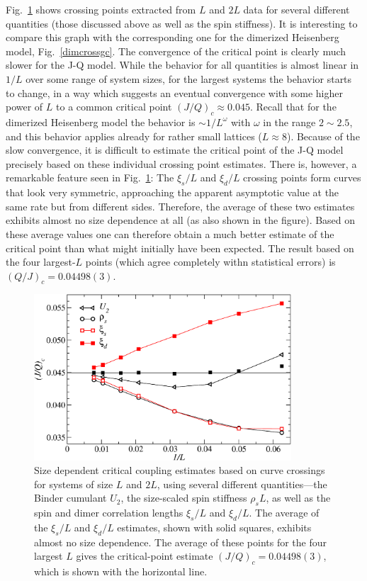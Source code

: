 \documentclass[draft,numberedheadings]{aipproc}
\begin{document}
Fig.~\ref{jqcross} shows crossing points extracted from $L$ and $2L$ data for several different quantities (those discussed above as well as the 
spin stiffness). It is interesting to compare this graph with the corresponding one for the dimerized Heisenberg model, Fig.~\ref{dimcrossgc}. The 
convergence of the critical point is clearly much slower for the J-Q model. While the behavior for all quantities is almost linear in $1/L$ over some 
range of system sizes, for the largest systems the behavior starts to change, in a way which suggests an eventual convergence with some higher 
power of $L$ to a common critical point $(J/Q)_c\approx 0.045$. Recall that for the dimerized Heisenberg model the behavior is $\sim 1/L^\omega$ 
with $\omega$ in the range $2 \sim 2.5$, and this behavior applies already for rather small lattices ($L\approx 8$). Because of the slow convergence, 
it is difficult to estimate the critical point of the J-Q model precisely based on these individual crossing point estimates. There is, however,
a remarkable feature seen in Fig.~\ref{jqcross}: The $\xi_s/L$ and $\xi_d/L$ crossing points form curves that look very symmetric, approaching the 
apparent asymptotic value at the same rate but from different sides. Therefore, the average of these two estimates exhibits almost no size dependence 
at all (as also shown in the figure). Based on these average values one can therefore obtain a much better estimate of the critical point than what 
might initially have been expected. The result based on the four largest-$L$ points (which agree completely withn statistical errors) is 
$(Q/J)_c=0.04498(3)$. 
\begin{figure}
\includegraphics[width=9.6cm, clip]{jqcross.eps}
\caption{Size dependent critical coupling estimates based on curve crossings for systems of size $L$ and $2L$, using several different quantities---the 
Binder cumulant $U_2$, the size-scaled spin stiffness $\rho_sL$, as well as the spin and dimer correlation lengths $\xi_s/L$ and $\xi_d/L$. The average
of the $\xi_s/L$ and $\xi_d/L$ estimates, shown with solid squares, exhibits almost no size dependence. The average of these points for the four 
largest $L$ gives the critical-point estimate $(J/Q)_c=0.04498(3)$, which is shown with the horizontal line.}
\label{jqcross}
\end{figure}
\end{document}
